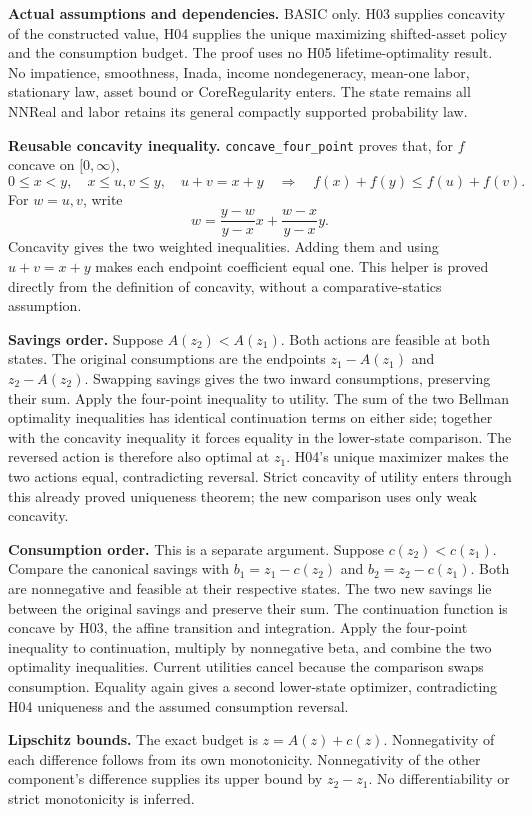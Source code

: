 \documentclass[
  11pt,
]{article}
\let\LedgerOriginalTexttt\texttt
\renewcommand{\texttt}[1]{{\small\LedgerOriginalTexttt{#1}}}
\begin{document}
\textbf{Actual assumptions and dependencies.} BASIC only. H03 supplies
concavity of the constructed value, H04 supplies the unique maximizing
shifted-asset policy and the consumption budget. The proof uses no H05
lifetime-optimality result. No impatience, smoothness, Inada, income
nondegeneracy, mean-one labor, stationary law, asset bound or
CoreRegularity enters. The state remains all NNReal and labor retains
its general compactly supported probability law.

\textbf{Reusable concavity inequality.} \texttt{concave\_four\_point}
proves that, for \(f\) concave on \([0,\infty)\),
\[0\leq x<y,\quad x\leq u,v\leq y,\quad u+v=x+y
\quad\Longrightarrow\quad f(x)+f(y)\leq f(u)+f(v).\] For \(w=u,v\),
write \[w=\frac{y-w}{y-x}x+\frac{w-x}{y-x}y.\] Concavity gives the two
weighted inequalities. Adding them and using \(u+v=x+y\) makes each
endpoint coefficient equal one. This helper is proved directly from the
definition of concavity, without a comparative-statics assumption.

\textbf{Savings order.} Suppose \(A(z_2)<A(z_1)\). Both actions are
feasible at both states. The original consumptions are the endpoints
\(z_1-A(z_1)\) and \(z_2-A(z_2)\). Swapping savings gives the two inward
consumptions, preserving their sum. Apply the four-point inequality to
utility. The sum of the two Bellman optimality inequalities has
identical continuation terms on either side; together with the concavity
inequality it forces equality in the lower-state comparison. The
reversed action is therefore also optimal at \(z_1\). H04's unique
maximizer makes the two actions equal, contradicting reversal. Strict
concavity of utility enters through this already proved uniqueness
theorem; the new comparison uses only weak concavity.

\textbf{Consumption order.} This is a separate argument. Suppose
\(c(z_2)<c(z_1)\). Compare the canonical savings with \(b_1=z_1-c(z_2)\)
and \(b_2=z_2-c(z_1)\). Both are nonnegative and feasible at their
respective states. The two new savings lie between the original savings
and preserve their sum. The continuation function is concave by H03, the
affine transition and integration. Apply the four-point inequality to
continuation, multiply by nonnegative beta, and combine the two
optimality inequalities. Current utilities cancel because the comparison
swaps consumption. Equality again gives a second lower-state optimizer,
contradicting H04 uniqueness and the assumed consumption reversal.

\textbf{Lipschitz bounds.} The exact budget is \(z=A(z)+c(z)\).
Nonnegativity of each difference follows from its own monotonicity.
Nonnegativity of the other component's difference supplies its upper
bound by \(z_2-z_1\). No differentiability or strict monotonicity is
inferred.
\end{document}
